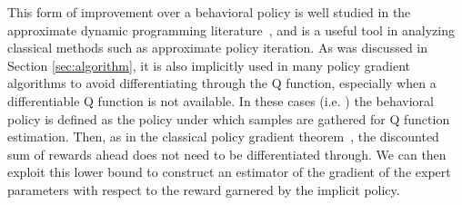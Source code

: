 This form of improvement over a behavioral policy is well studied in the approximate dynamic programming literature~\cite{bertsekas2019reinforcement}, and is a useful tool in analyzing classical methods such as approximate policy iteration. As was discussed in Section \ref{sec:algorithm}, it is also implicitly used in many policy gradient algorithms to avoid differentiating through the Q function, especially when a differentiable Q function is not available. In these cases (i.e. \citet{schulman2017proximal,schulman2015trust,schulman2015high,williams1992simple}) the behavioral policy is defined as the policy under which samples are gathered for Q function estimation. Then, as in the classical policy gradient theorem~\citep{bertsekas2019reinforcement,sutton1992reinforcement,williams1992simple}, the discounted sum of rewards ahead does not need to be differentiated through.  We can then exploit this lower bound to construct an estimator of the gradient of the expert parameters with respect to the reward garnered by the implicit policy. 

